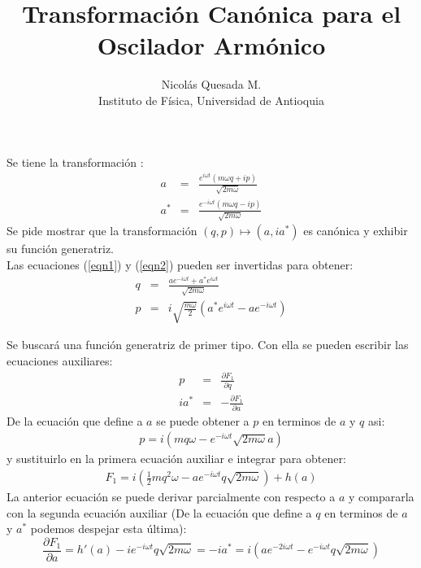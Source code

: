\documentclass[spanish,12pt]{shreyasnotes}
\title{Transformaci\'on Can\'onica para el Oscilador Arm\'onico}
\author{Nicol\'as Quesada M.\\{\small \sf Instituto de F\'isica, Universidad de Antioquia}}
\date{}
\begin{document}
\maketitle

Se tiene la transformaci\'on :
\begin{eqnarray}
a&=&\frac{e^{i  \omega t} (m \omega q + i p )}{
   \sqrt{ 2 m \omega }} 
\label{eqn1}
\\
a^*&=&\frac{e^{-i  \omega t} (m \omega q - i p)}{
   \sqrt{ 2m \omega }} 
\label{eqn2}
\end{eqnarray}
Se pide mostrar que la transformaci\'on $(q,p)\longmapsto(a,ia^{*})$ es can\'onica y exhibir su funci\'on generatriz.\\

Las ecuaciones (\ref{eqn1}) y (\ref{eqn2}) pueden ser invertidas para obtener:
\begin{eqnarray}
q&=&\frac{ a e^{-i \omega t }+a^* e^{i \omega t}}{\sqrt{2 m \omega}}\\
p&=&i  \sqrt{\frac{m \omega}{2}} \left(a^* e^{i \omega t}-a e^{-i \omega t}\right)
\end{eqnarray}

Se buscar\'a una funci\'on generatriz de primer tipo. Con ella se pueden escribir las ecuaciones auxiliares:
\begin{eqnarray}
p&=&\frac{\partial F_1}{\partial q} \\
i a^*&=&-\frac{\partial F_1}{\partial a} 
\end{eqnarray}
De la ecuaci\'on que define a $a$ se puede obtener a $p$ en terminos de $a$ y $q$ asi:
\begin{eqnarray}
p=i \left(m q \omega - e^{-i \omega t} \sqrt{2 m \omega} a \right)
\end{eqnarray}
y sustituirlo en la primera ecuaci\'on auxiliar e integrar para obtener:
\begin{eqnarray}
F_1=i \left(\frac{1}{2} m q^2 \omega - a e^{-i 
   \omega t} q \sqrt{2 m \omega }\right)+h(a)
\end{eqnarray}
La anterior ecuaci\'on se puede derivar parcialmente con respecto a $a$ y compararla con la segunda ecuaci\'on auxiliar (De la ecuaci\'on que define a $q$ en terminos de $a$ y $a^*$ podemos despejar esta \'ultima):
\begin{equation}
\frac{\partial F_1}{\partial a}=h'(a)-i  e^{-i  \omega t} q \sqrt{2 m \omega }=-i a^*=i \left(a e^{-2 i  \omega t}- e^{-i  \omega t } q \sqrt{2 m \omega }\right)
\end{equation}
\end{document}

